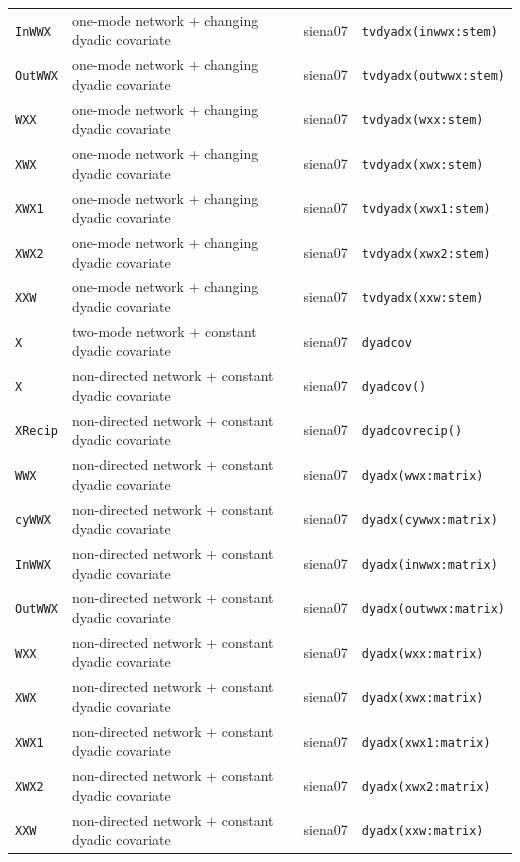 \begin{longtable}{@{}p{2.6cm}p{3.2cm}p{2.9cm}p{5.4cm}@{}}
\texttt{InWWX} & one-mode network + changing dyadic covariate & siena07 & \texttt{tvdyadx(inwwx:stem)}\\
\texttt{OutWWX} & one-mode network + changing dyadic covariate & siena07 & \texttt{tvdyadx(outwwx:stem)}\\
\texttt{WXX} & one-mode network + changing dyadic covariate & siena07 & \texttt{tvdyadx(wxx:stem)}\\
\texttt{XWX} & one-mode network + changing dyadic covariate & siena07 & \texttt{tvdyadx(xwx:stem)}\\
\texttt{XWX1} & one-mode network + changing dyadic covariate & siena07 & \texttt{tvdyadx(xwx1:stem)}\\
\texttt{XWX2} & one-mode network + changing dyadic covariate & siena07 & \texttt{tvdyadx(xwx2:stem)}\\
\texttt{XXW} & one-mode network + changing dyadic covariate & siena07 & \texttt{tvdyadx(xxw:stem)}\\
\texttt{X} & two-mode network + constant dyadic covariate & siena07 & \texttt{dyadcov}\\
\texttt{X} & non-directed network + constant dyadic covariate & siena07 & \texttt{dyadcov()}\\
\texttt{XRecip} & non-directed network + constant dyadic covariate & siena07 & \texttt{dyadcovrecip()}\\
\texttt{WWX} & non-directed network + constant dyadic covariate & siena07 & \texttt{dyadx(wwx:matrix)}\\
\texttt{cyWWX} & non-directed network + constant dyadic covariate & siena07 & \texttt{dyadx(cywwx:matrix)}\\
\texttt{InWWX} & non-directed network + constant dyadic covariate & siena07 & \texttt{dyadx(inwwx:matrix)}\\
\texttt{OutWWX} & non-directed network + constant dyadic covariate & siena07 & \texttt{dyadx(outwwx:matrix)}\\
\texttt{WXX} & non-directed network + constant dyadic covariate & siena07 & \texttt{dyadx(wxx:matrix)}\\
\texttt{XWX} & non-directed network + constant dyadic covariate & siena07 & \texttt{dyadx(xwx:matrix)}\\
\texttt{XWX1} & non-directed network + constant dyadic covariate & siena07 & \texttt{dyadx(xwx1:matrix)}\\
\texttt{XWX2} & non-directed network + constant dyadic covariate & siena07 & \texttt{dyadx(xwx2:matrix)}\\
\texttt{XXW} & non-directed network + constant dyadic covariate & siena07 & \texttt{dyadx(xxw:matrix)}\\

\end{longtable}
